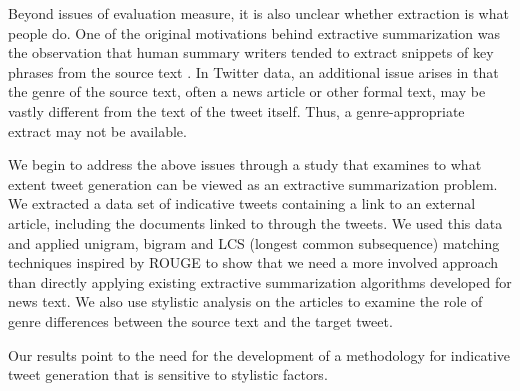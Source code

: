 Beyond issues of evaluation measure, it is also unclear whether extraction is what people do. One of the original motivations behind extractive summarization was the observation that human summary writers tended to extract snippets of key phrases from the source text \cite{mani-2001}. In Twitter data, an additional issue arises in that the genre of the source text, often a news article or other formal text, may be vastly different from the text of the tweet itself. Thus, a genre-appropriate extract may not be available.



We begin to address the above issues through a study that examines to what extent tweet generation can be viewed as an extractive summarization problem. We extracted a data set of indicative tweets containing a link to an external article, including the documents linked to through the tweets. We used this data and applied unigram, bigram and LCS (longest common subsequence) matching techniques inspired by ROUGE to show that we need a more involved approach than directly applying existing extractive summarization algorithms developed for news text. We also use stylistic analysis on the articles to examine the role of genre differences between the source text and the target tweet.

Our results point to the need for the development of a methodology for indicative tweet generation that is sensitive to stylistic factors. 
